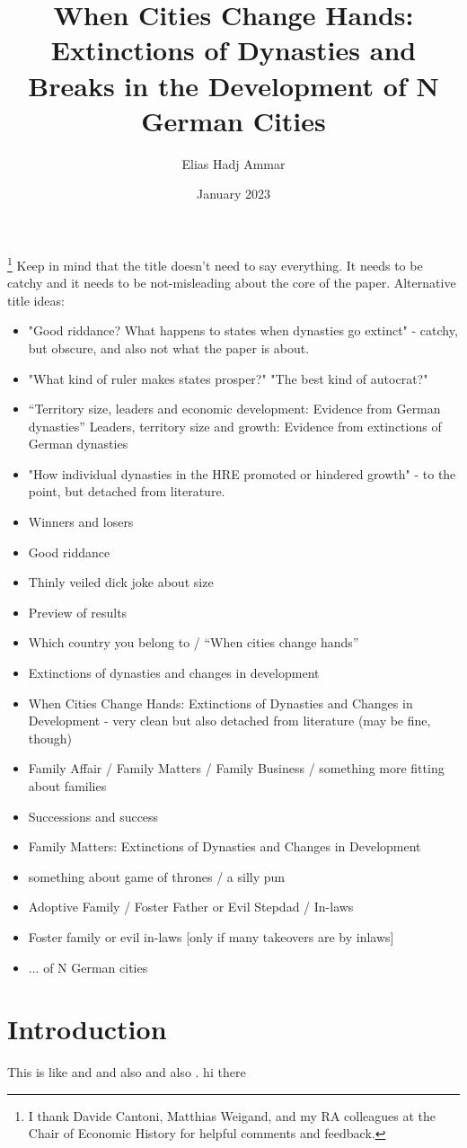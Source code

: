 \documentclass{article}
\title{When Cities Change Hands: Extinctions of Dynasties and \\Breaks in the Development of N German Cities}
\author{Elias Hadj Ammar}
\date{January 2023}
\begin{document}
\maketitle
\footnote{I thank Davide Cantoni, Matthias Weigand, and my RA colleagues at the Chair of Economic History for helpful comments and feedback.}
Keep in mind that the title doesn't need to say everything. It needs to be catchy and it needs to be not-misleading about the core of the paper.
Alternative title ideas: 
\begin{itemize}
    \item "Good riddance? What happens to states when dynasties go extinct" - catchy, but obscure, and also not what the paper is about.
    \item "What kind of ruler makes states prosper?" "The best kind of autocrat?"
    \item ``Territory size, leaders and economic development: Evidence from German dynasties'' {Leaders, territory size and growth: Evidence from extinctions of German dynasties}

    \item "How individual dynasties in the HRE promoted or hindered growth" - to the point, but detached from literature.
    \item Winners and losers
    \item Good riddance
    \item Thinly veiled dick joke about size
    \item Preview of results
    \item Which country you belong to / ``When cities change hands''
    \item {Extinctions of dynasties and changes in development}
    \item {When Cities Change Hands: Extinctions of Dynasties and Changes in Development} - very clean but also detached from literature (may be fine, though)
    \item Family Affair / Family Matters / Family Business / something more fitting about families
    \item Successions and success
    \item {Family Matters: Extinctions of Dynasties and Changes in Development}
    \item something about game of thrones / a silly pun
    \item Adoptive Family / Foster Father or Evil Stepdad / In-laws
    \item Foster family or evil in-laws [only if many takeovers are by inlaws]
    \item ... of N German cities
\end{itemize}

\newpage

\setcounter{page}{1}
 
\section{Introduction}

This is like \cite{as1997} and \cite{aw1998} and also \cite{as1997} and also \cite{olken2005}. hi there \cite{olken2005}

\newpage


\end{document}
